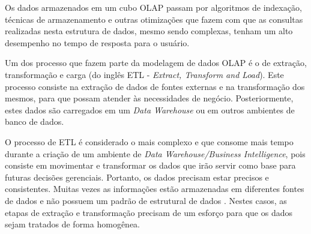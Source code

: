 Os dados armazenados em um cubo OLAP passam por algoritmos de indexação, técnicas de armazenamento e outras otimizações que fazem com que as consultas realizadas nesta estrutura de dados, mesmo sendo complexas, tenham um alto desempenho no tempo de resposta para o usuário.

Um dos processo que fazem parte da modelagem de dados OLAP é o de extração, transformação e carga (do inglês ETL - \emph{Extract, Transform and Load}). Este processo consiste na extração de dados de fontes externas e na transformação dos mesmos, para que possam atender às necessidades de negócio. Posteriormente, estes dados são carregados em um \emph{Data Warehouse} ou em outros ambientes de banco de dados.

O processo de ETL é considerado o mais complexo e que consome mais tempo durante a criação de um ambiente de \emph{Data Warehouse/Business Intelligence}, pois consiste em movimentar e transformar os dados que irão servir como base para futuras decisões gerenciais. Portanto, os dados precisam estar precisos e consistentes. 
Muitas vezes as informações estão armazenadas em diferentes fontes de dados e não possuem um padrão de estrutural de dados \cite{KIM13}. Nestes casos, as etapas de extração e transformação precisam de um esforço para que os dados sejam tratados de forma homogênea.























